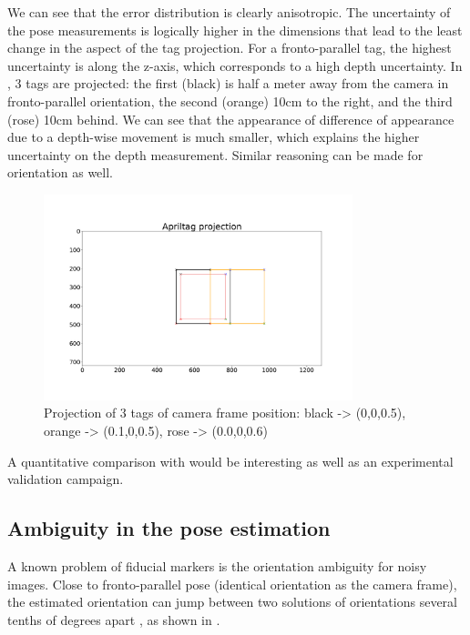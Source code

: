 We can see that the error distribution is clearly anisotropic. The uncertainty of the pose measurements
is logically higher in the dimensions that lead to the least change in the aspect of the tag projection. For a fronto-parallel tag, the highest 
uncertainty is along the z-axis, which corresponds to a high depth uncertainty.
In , 3 tags are projected: the first (black) is half a meter away from the camera in fronto-parallel orientation, the second (orange)
10cm to the right, and the third (rose) 10cm behind. We can see that the appearance of difference of appearance due to a depth-wise movement is much smaller, which 
explains the higher uncertainty on the depth measurement. Similar reasoning can be made for orientation as well. 

\begin{figure}[h]
    \centering
    \includegraphics[width=0.8\textwidth]{figures/apriltag_proj.pdf}
    \caption{Projection of 3 tags of camera frame position: black -> (0,0,0.5), orange -> (0.1,0,0.5), rose -> (0.0,0,0.6)}
    \label{fig:apriltag_proj}
\end{figure}

A quantitative comparison with \cite{urban2016mlpnp} would be interesting as well as an experimental validation campaign.


\subsection{Ambiguity in the pose estimation}

A known problem of fiducial markers is the orientation ambiguity for noisy images. Close to fronto-parallel pose (identical orientation as 
the camera frame), the estimated orientation can jump between two solutions of orientations several tenths of degrees apart \cite{8206468}, as shown in .

